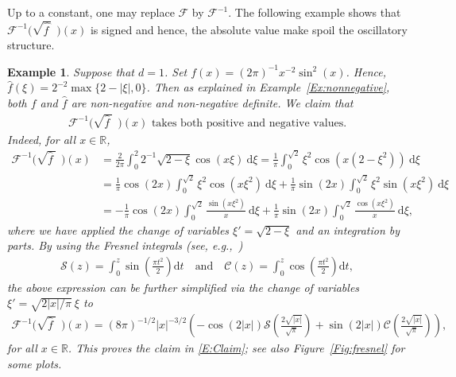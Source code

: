 \documentclass[sn-mathphys]{sn-jnl}%
\newcommand{\BR}{\mathbb{R}}
\newcommand{\ud}{\ensuremath{\mathrm{d}}}
\numberwithin{equation}{section}
\theoremstyle{thmstyleone}%
\theoremstyle{thmstyletwo}%
\newtheorem{example}{Example}[section]%
\theoremstyle{thmstylethree}%
\begin{document}
Up to a constant, one may replace $\mathcal{F}$ by $\mathcal{F}^{-1}$. The following example shows
that $\mathcal{F}^{-1}\big(\sqrt{\widehat{f\:}}\:\:\big)(x)$ is signed and hence, the absolute value
make spoil the oscillatory structure.

\begin{example}\label{Ex:Finv}
  Suppose that $d = 1$. Set $f(x) = (2\pi)^{-1}x^{-2}\sin^2 (x)$. Hence, $\widehat{f}(\xi) =
  2^{-2}\max\{2-\lvert \xi \rvert,0\}$. Then as explained in Example~\ref{Ex:nonnegative}, both $f$ and
  $\widehat{f}$ are non-negative and non-negative definite. We claim that
	\begin{align}\label{E:Claim}
	\text{$\mathcal{F}^{-1}\big(\sqrt{\widehat{f}\:}\:\:\big)(x)$ takes both positive and negative values.}
	\end{align}
  Indeed, for all $x\in\BR$,
	\begin{align*}
    \mathcal{F}^{-1}\big(\sqrt{\widehat{f}\:}\:\:\big)(x)
    & = \frac{2}{2\pi} \int_0^2 2^{-1}\sqrt{2-\xi} \cos(x \xi) \: \ud \xi
      = \frac{1}{\pi} \int_0^{\sqrt{2}} \xi^2 \cos\left(x\left(2-\xi^2\right)\right) \: \ud \xi \\
    & = \frac{1}{\pi}\cos(2x) \int_0^{\sqrt{2}} \xi^2 \cos(x \xi^2) \: \ud \xi + \frac{1}{\pi} \sin(2x) \int_0^{\sqrt{2}} \xi^2 \sin(x \xi^2) \: \ud \xi \\
    & = - \frac{1}{\pi} \cos(2x) \int_0 ^{\sqrt{2}} \frac{\sin(x \xi^2)}{x} \: \ud \xi + \frac{1}{\pi} \sin(2x) \int_0 ^{\sqrt{2}} \frac{\cos(x \xi^2)}{x} \: \ud \xi,
  \end{align*}
  where we have applied the change of variables $\xi' = \sqrt{2 - \xi}$ and an integration by parts.
  By using the \textit{Fresnel integrals} (see, e.g.,~\cite[7.2 (iii)]{olver.lozier.ea:10:nist})
  \begin{align*}
    \mathcal{S}(z) = \int_0^{z} \sin\left(\frac{\pi t^2}{2}\right) \ud t \quad \text{and} \quad
    \mathcal{C}(z) = \int_0^z \cos\left(\frac{\pi t^2}{2}\right) \ud t,
	\end{align*}
  the above expression can be further simplified via the change of variables $\xi' = \sqrt{2\lvert x \rvert/\pi}
  \: \xi$ to
	\begin{align*}
    \mathcal{F}^{-1}\big(\sqrt{\widehat{f}\:}\:\:\big)(x)
    = (8\pi)^{-1/2} \lvert x \rvert^{-3/2} \left(
      -\cos(2\left\lvert x\right\rvert) \mathcal{S}\left(\frac{2\sqrt{\lvert x \rvert}}{\sqrt{\pi}}\right)
      +\sin(2\left\lvert x\right\rvert) \mathcal{C}\left(\frac{2\sqrt{\lvert x \rvert}}{\sqrt{\pi}}\right)
    \right),
	\end{align*}
  for all $x\in\BR$. This proves the claim in \eqref{E:Claim}; see also Figure~\ref{Fig:fresnel} for
  some plots.
\end{example}
\end{document}
